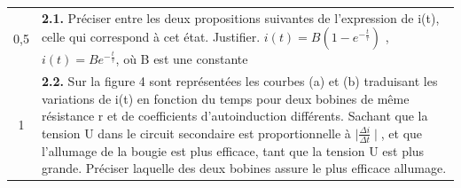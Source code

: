 \documentclass[12pt]{article}
\begin{document}
\hspace{-0.8cm}
\begin{tabular}{c|l}	

	0,5 & \makecell[l]{\textbf{2.1. }Préciser entre les deux propositions suivantes de l’expression de i(t), celle qui correspond à \\cet état. Justifier. $i(t) = B(1-e^{-\frac{t}{\tau}})$  , $i(t) = Be^{-\frac{t}{\tau}}$, où B est une constante}\\
		1 & \makecell[l]{\textbf{2.2. }Sur la figure 4 sont
représentées les courbes (a)
et (b) traduisant les
variations de i(t) en fonction
\\du temps pour deux
bobines de même résistance r et de coefficients d’autoinduction différents.\\
Sachant que la tension U dans le circuit secondaire est proportionnelle à $\mid \frac{\Delta{i}}{\Delta{t}} \mid$, et que
l’allumage\\ de la bougie est plus efficace, tant que la tension U est plus grande.
Préciser laquelle des deux \\bobines assure le plus efficace allumage.
}\\

\end{tabular}



\end{document}

